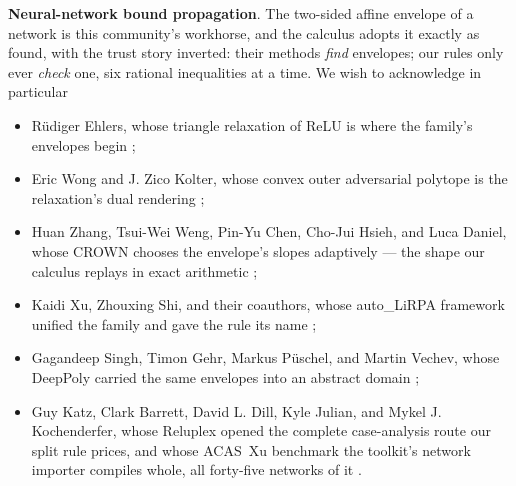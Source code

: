 
\item \textbf{Neural-network bound propagation}. The two-sided affine
  envelope of a network is this community's workhorse, and the
  calculus adopts it exactly as found, with the trust story inverted:
  their methods \emph{find} envelopes; our rules only ever
  \emph{check} one, six rational inequalities at a time. We wish to
  acknowledge in particular
  \begin{itemize}
    \item R\"udiger Ehlers, whose triangle relaxation of ReLU is
      where the family's envelopes begin \cite{ehlers2017};
    \item Eric Wong and J. Zico Kolter, whose convex outer
      adversarial polytope is the relaxation's dual rendering
      \cite{wongkolter2018};
    \item Huan Zhang, Tsui-Wei Weng, Pin-Yu Chen, Cho-Jui Hsieh, and
      Luca Daniel, whose CROWN chooses the envelope's slopes
      adaptively --- the shape our calculus replays in \mbox{exact}
      arithmetic \cite{zhang2018crown};
    \item Kaidi Xu, Zhouxing Shi, and their coauthors, whose
      auto\_LiRPA framework unified the family and gave the
       rule its name \cite{xu2020lirpa};
    \item Gagandeep Singh, Timon Gehr, Markus P\"uschel, and Martin
      Vechev, whose DeepPoly carried the same envelopes into an
      abstract domain \cite{singh2019deeppoly};
    \item Guy Katz, Clark Barrett, David L. Dill, Kyle Julian, and
      Mykel J. Kochenderfer, whose Reluplex opened the complete
      case-analysis route our split rule prices, and whose ACAS~Xu
      benchmark the toolkit's network importer compiles whole, all
      forty-five networks of it \cite{katz2017reluplex}.
  \end{itemize}
